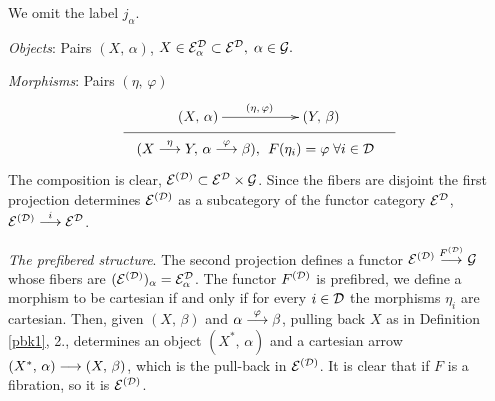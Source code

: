 \begin{definitionst}  \label{ExpoDelta} 
We omit the label $j_\alpha$. 

\vspace{1ex}
 
\emph{Objects}:  Pairs $(X, \, \alpha)$, 
$X \in \mathcal{E}_\alpha^\mathcal{D} \subset \mathcal{E}^\mathcal{D},\; \alpha \in \mathcal{G}.$  

\vspace{1ex}

\emph{Morphisms}:  Pairs $(\eta,\, \varphi)$ 
$$
\xymatrix@R=0ex@C=0ex
    {
   && (X, \, \alpha) \ar[r]^{(\eta, \, \varphi)}
    & (Y, \, \beta)
   \\
      {} \ar@{-}[rrrrrr]
   &&&&&& {}
   \\
   &&
   (X \mr{\eta} Y,\, \alpha \mr{\varphi} \beta), & 
   F(\eta_i) = \varphi \; \forall i \in \cc{D}
   }
$$
The composition is clear, $\mathcal{E}^{(\mathcal{D})} \subset \mathcal{E}^\mathcal{D} \times \mathcal{G}$. Since the fibers are disjoint the first projection determines  
$\mathcal{E}^{(\mathcal{D})}$ as a subcategory of the functor category
 $\mathcal{E}^\mathcal{D}$, $\mathcal{E}^{(\mathcal{D})} \overset {i} {\longrightarrow} \mathcal{E}^\mathcal{D}$.  

\vspace{1ex}
%
\emph{The prefibered structure}.
The second projection defines a functor 
 $\mathcal{E}^{(\mathcal{D})} \overset {F^{(\mathcal{D})}} {\longrightarrow} \mathcal{G}$ whose fibers are 
 $(\mathcal{E}^{(\mathcal{D})})_\alpha = \mathcal{E}_\alpha^\mathcal{D}$. 
%           
%  
The functor $F^{(\mathcal{D})}$ is prefibred, we define a morphism to be cartesian if and only if for every $i \in \mathcal{D}$ the morphisms $\eta_i$ are cartesian. Then, given $(X,\, \beta)$ and 
$\alpha \overset {\varphi} {\longrightarrow} \beta$, pulling back $X$ as in Definition 
\ref{pbk1}, 2., determines an object $(X^*, \, \alpha)$ and a cartesian arrow  
$(X^*, \, \alpha) \overset {} {\longrightarrow} (X,\, \beta)$, which is the pull-back in 
$\mathcal{E}^{(\mathcal{D})}$.
It is clear that if $F$ is a fibration, so it is $\mathcal{E}^{(\mathcal{D})}$.
\cqd 
   
\end{definitionst}

